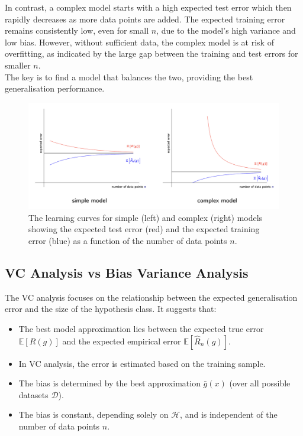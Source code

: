 In contrast, a complex model starts with a high expected test error which then rapidly decreases as more data points are added. The expected training error remains consistently low, even for small $n$, due to the model's high variance and low bias. However, without sufficient data, the complex model is at risk of overfitting, as indicated by the large gap between the training and test errors for smaller $n$.\\

The key is to find a model that balances the two, providing the best generalisation performance.


\begin{figure}[H]

    \centering
    \includegraphics[width=1\linewidth]{img/learning_curves.png}
    \caption{The learning curves for simple (left) and complex (right) models showing the expected test error (red) and the expected training error (blue) as a function of the number of data points $n$.}
    
\end{figure}

\subsection{VC Analysis vs Bias Variance Analysis}
The VC analysis focuses on the relationship between the expected generalisation error and the size of the hypothesis class. It suggests that:
\begin{itemize}
    \item The best model approximation lies between the expected true error $\mathbb{E}[R(g)]$ and the expected empirical error $\mathbb{E}[\hat{R}_n(g)]$.
    \item In VC analysis, the error is estimated based on the training sample.
    \item The bias is determined by the best approximation $\bar{g}(x)$ (over all possible datasets $\mathcal{D}$).
    \item The bias is constant, depending solely on $\mathcal{H}$, and is independent of the number of data points $n$.
\end{itemize}


